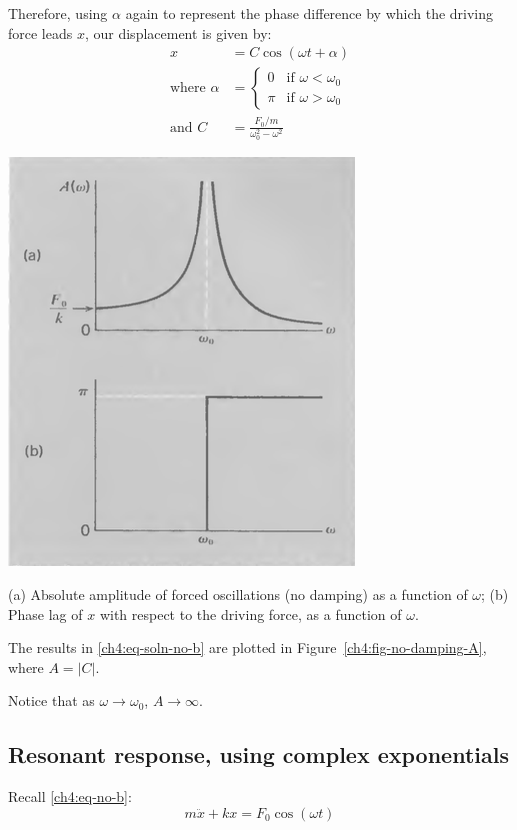 Therefore, using $\alpha$ again to represent the phase difference by which the driving force leads $x$, our displacement is given by:
\begin{equation}
\boxed{
	\begin{split}
		x &= C \cos(\omega t + \alpha)  \\
		\text{where }
		\alpha &= 
		\begin{cases}
			0 & \text{if } \omega<\omega_0 \\
			\pi & \text{if } \omega>\omega_0
		\end{cases}
		\\
		\text{and }
		C &= \frac{F_0/m}{\omega_0^2-\omega^2}
	\end{split}
}
\label{ch4:eq-soln-no-b}
\end{equation}


\begin{marginfigure}
	\centering
	\includegraphics[scale=0.5]{phys232/Ch4-forced-no-damping-A.png} \caption{(a) Absolute amplitude of forced oscillations (no damping) as a function of $\omega$; (b) Phase lag of $x$ with respect to the driving force, as a function of $\omega$.}	\label{ch4:fig-no-damping-A}
\end{marginfigure}

The results in \eqref{ch4:eq-soln-no-b} are plotted in Figure~\ref{ch4:fig-no-damping-A}, where $A=|C|$.

Notice that as $\omega\to\omega_0$, $A\to \infty$.


\subsection{Resonant response, using complex exponentials}
Recall \eqref{ch4:eq-no-b}:
\[ m\ddot{x} + kx = F_0 \cos(\omega t) \]

